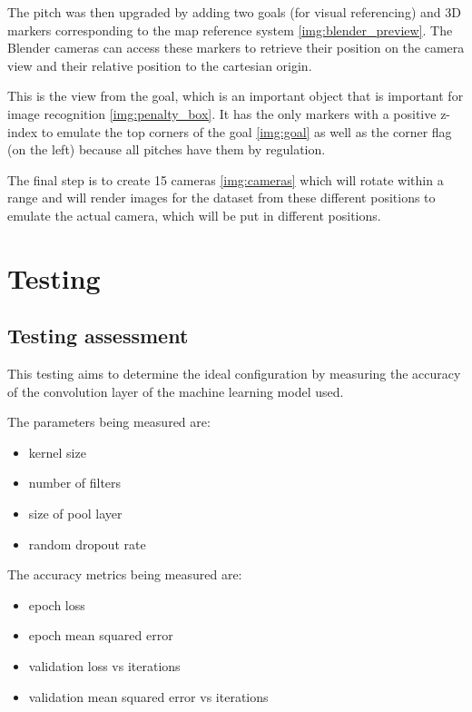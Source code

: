 \documentclass[
    11pt,
    oneside
]{report}
\begin{document}
The pitch was then upgraded by adding two goals (for visual referencing) and 3D markers corresponding to the map reference system \ref{img:blender_preview}. The Blender cameras can access these markers to retrieve their position on the camera view and their relative position to the cartesian origin.



This is the view from the goal, which is an important object that is important for image recognition \ref{img:penalty_box}. It has the only markers with a positive z-index to emulate the top corners of the goal \ref{img:goal} as well as the corner flag (on the left) because all pitches have them by regulation.



The final step is to create 15 cameras \ref{img:cameras} which will rotate within a range and will render images for the dataset from these different positions to emulate the actual camera, which will be put in different positions.





\chapter{Testing}



\section{Testing assessment}


This testing aims to determine the ideal configuration by measuring the accuracy of the convolution layer of the machine learning model used.

The parameters being measured are:
\begin{itemize}
    \item
      kernel size
    \item
      number of filters
    \item
      size of pool layer
    \item
      random dropout rate
\end{itemize}


The accuracy metrics being measured are:
\begin{itemize}
    \item
        epoch loss
    \item
        epoch mean squared error
    \item
        validation loss vs iterations
    \item
        validation mean squared error vs iterations
\end{itemize}
\end{document}
